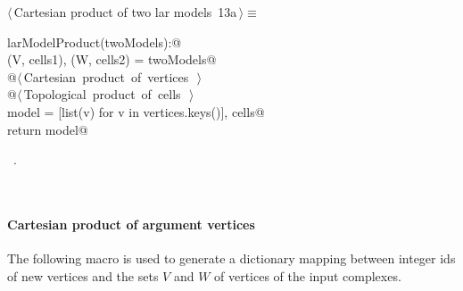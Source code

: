 \documentclass[11pt,oneside]{article}	%
\begin{document}
\begin{flushleft} \small
\begin{minipage}{\linewidth} \label{scrap18}
\protect{}$\langle\,$Cartesian product of two lar models\nobreak\ {\footnotesize 13a}$\,\rangle\equiv$
\vspace{-1ex}
\begin{list}{}{} \item
\mbox{}\verb@def larModelProduct(twoModels):@\\
\mbox{}\verb@    (V, cells1), (W, cells2) = twoModels@\\
\mbox{}\verb@    @\hbox{$\langle\,$Cartesian product of vertices\nobreak\ {\footnotesize {}}$\,\rangle$}\verb@@\\
\mbox{}\verb@    @\hbox{$\langle\,$Topological product of cells\nobreak\ {\footnotesize {}}$\,\rangle$}\verb@@\\
\mbox{}\verb@    model = [list(v) for v in vertices.keys()], cells@\\
\mbox{}\verb@    return model@\\
\mbox{}\verb@@{\NWsep}
\end{list}
\vspace{-1ex}
\footnotesize\addtolength{\baselineskip}{-1ex}
\begin{list}{}{\setlength{\itemsep}{-\parsep}\setlength{\itemindent}{-\leftmargin}}
\item \NWtxtMacroRefIn\ .
\end{list}
\end{minipage}\\[4ex]
\end{flushleft}

\paragraph{Cartesian product of argument vertices}
The following macro is used to generate a dictionary mapping between integer ids of new vertices and the sets $V$ and $W$ of vertices of the input complexes.
\end{document}
